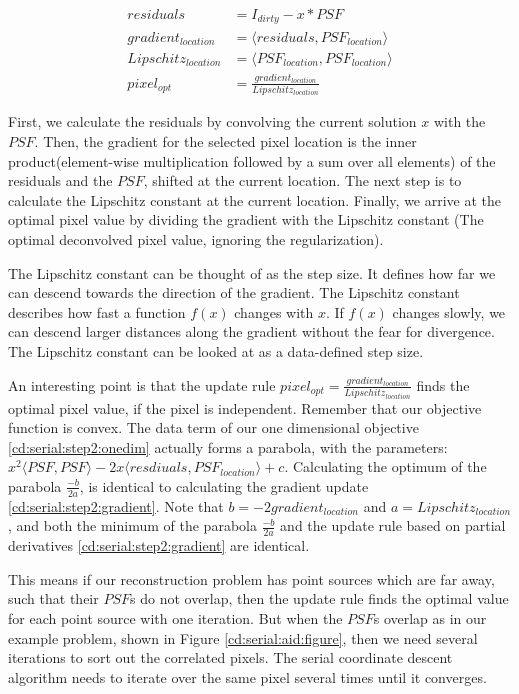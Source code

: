 \begin{equation}\label{cd:serial:step2:gradient}
\begin{split}
residuals &= I_{dirty} - x * PSF \\
gradient_{location} &= \langle residuals, PSF_{location} \rangle \\
Lipschitz_{location} &= \langle PSF_{location}, PSF_{location} \rangle \\
pixel_{opt} &= \frac{gradient_{location}}{Lipschitz_{location}}
\end{split}
\end{equation}

First, we calculate the residuals by convolving the current solution $x$ with the $PSF$. Then, the gradient for the selected pixel location is the inner product(element-wise multiplication followed by a sum over all elements) of the residuals and the $PSF$, shifted at the current location. The next step is to calculate the Lipschitz constant at the current location. Finally, we arrive at the optimal pixel value by dividing the gradient with the Lipschitz constant (The optimal deconvolved pixel value, ignoring the regularization).

The Lipschitz constant can be thought of as the step size. It defines how far we can descend towards the direction of the gradient. The Lipschitz constant describes how fast a function $f(x)$ changes with $x$. If $f(x)$ changes slowly, we can descend larger distances along the gradient without the fear for divergence. The Lipschitz constant can be looked at as a data-defined step size.

An interesting point is that the update rule $pixel_{opt} = \frac{gradient_{location}}{Lipschitz_{location}}$ finds the optimal pixel value, if the pixel is independent. Remember that our objective function is convex. The data term of our one dimensional objective \eqref{cd:serial:step2:onedim} actually forms a parabola, with the parameters: $x^2 \langle PSF, PSF \rangle - 2x \langle resdiuals, PSF_{location}\rangle + c$. Calculating the optimum of the parabola $\frac{-b}{2a}$, is identical to calculating the gradient update \eqref{cd:serial:step2:gradient}. Note that $b = -2 gradient_{location}$ and $a = Lipschitz_{location}$, and both the minimum of the parabola $\frac{-b}{2a}$ and the update rule based on partial derivatives \eqref{cd:serial:step2:gradient} are identical.

This means if our reconstruction problem has point sources which are far away, such that their $PSF$s do not overlap, then the update rule finds the optimal value for each point source with one iteration. But when the $PSF$s overlap as in our example problem, shown in Figure \ref{cd:serial:aid:figure}, then we need several iterations to sort out the correlated pixels. The serial coordinate descent algorithm needs to iterate over the same pixel several times until it converges.

